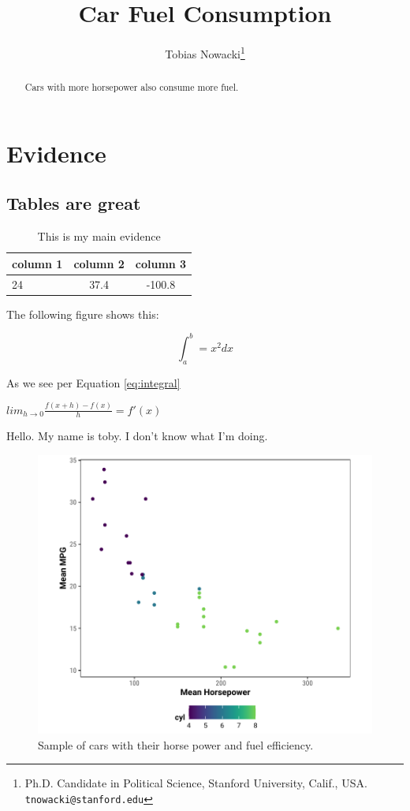 \documentclass[12pt]{article}
\title{Car Fuel Consumption}
\author{Tobias Nowacki\thanks{Ph.D. Candidate in Political Science, Stanford University, Calif., USA. \texttt{tnowacki@stanford.edu}}}
\begin{document}
\maketitle

\begin{abstract}
Cars with more horsepower also consume more fuel.
\end{abstract}


\doublespacing

\clearpage

\section{Evidence}

\parencite[][]{eggers2014a}

\subsection{Tables are great}

\begin{table}[tb]
    \caption{This is my main evidence}
    \label{tab:tablename}
    \centering

    \begin{tabular}{lcc}
    \toprule
    \textbf{column 1} & \textbf{column 2} & \textbf{column 3} \\
    \hline
        24 & 37.4 & -100.8 \\
    \bottomrule
    \end{tabular}
\end{table}

The following figure shows this:

\begin{equation}
\label{eq:integral}
\int_a^b = x^2 dx
\end{equation}

As we see per Equation \ref{eq:integral}


$lim_{h \rightarrow 0} \frac{f(x + h) - f(x)}{h} = f'(x)$


Hello. My name is toby. I don't know what I'm doing.


\begin{figure}[tb]
  \centering
  \includegraphics[]{output/plot1}
  \caption{Sample of cars with their horse power and fuel efficiency.}
  \label{fig:figure1}
\end{figure}

\printbibliography
\end{document}
